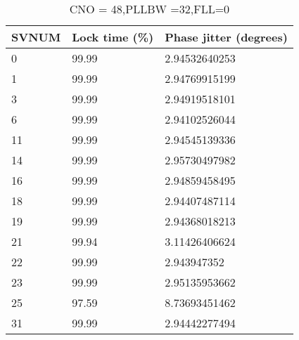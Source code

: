 
\begin{table}[!htb]
\centering
\begin{tabular}{|l|l|l|}
\hline
\rowcolor[HTML]{C0C0C0} 
SVNUM & Lock time (\%) & Phase jitter (degrees) \\ \hline
0     & 99.99 & 2.94532640253          \\ \hline
\rowcolor[HTML]{EFEFEF} 
1     & 99.99   & 2.94769915199          \\ \hline
3     & 99.99  & 2.94919518101          \\ \hline
\rowcolor[HTML]{EFEFEF} 
6     & 99.99  & 2.94102526044          \\ \hline
11    & 99.99  & 2.94545139336          \\ \hline
\rowcolor[HTML]{EFEFEF} 
14    & 99.99  & 2.95730497982          \\ \hline
16    & 99.99  & 2.94859458495          \\ \hline
\rowcolor[HTML]{EFEFEF} 
18    & 99.99  & 2.94407487114          \\ \hline
19    & 99.99  & 2.94368018213          \\ \hline
\rowcolor[HTML]{EFEFEF} 
21    & 99.94  & 3.11426406624          \\ \hline
22    & 99.99 & 2.943947352            \\ \hline
\rowcolor[HTML]{EFEFEF} 
23    & 99.99  & 2.95135953662          \\ \hline
25    & 97.59  & 8.73693451462          \\ \hline
\rowcolor[HTML]{EFEFEF} 
31    & 99.99  & 2.94442277494          \\ \hline
\end{tabular}

\caption{CNO = 48,PLLBW =32,FLL=0}
\label{my-label}
\end{table}


